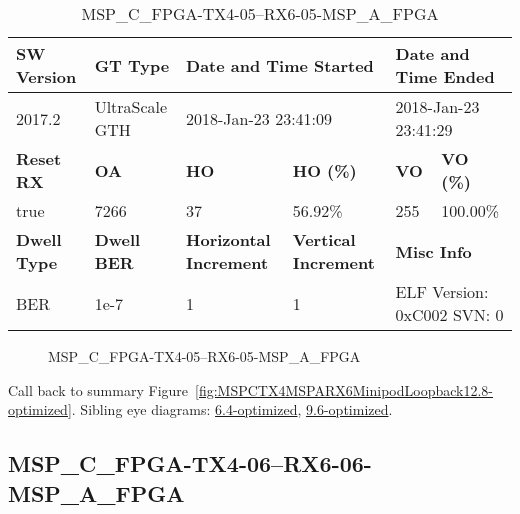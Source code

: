 \begin{table}[h]
\centering
\caption{MSP\_C\_FPGA-TX4-05--RX6-05-MSP\_A\_FPGA}
\label{tab:MSPCFPGATX405RX605MSPAFPGA12.8-optimized}
\begin{tabular}{@{}|l|l|l|l|l|l|@{}}
\toprule
\textbf{SW Version}                & \textbf{GT Type}   & \multicolumn{2}{l|}{\textbf{Date and Time Started}}            & \multicolumn{2}{l|}{\textbf{Date and Time Ended}}        \\ \midrule
2017.2                       & UltraScale GTH          & \multicolumn{2}{l|}{2018-Jan-23 23:41:09}                   & \multicolumn{2}{l|}{2018-Jan-23 23:41:29}               \\ \midrule
\textbf{Reset RX}                  & \textbf{OA} & \textbf{HO}   & \textbf{HO (\%)} & \textbf{VO} & \textbf{VO (\%)} \\ \midrule
true & 7266        & 37          & 56.92\%        & 255        & 100.00\%       \\ \midrule
\textbf{Dwell Type}                & \textbf{Dwell BER} & \textbf{Horizontal Increment} & \textbf{Vertical Increment}    & \multicolumn{2}{l|}{\textbf{Misc Info}}                  \\ \midrule
BER                            & 1e-7        & 1        & 1           & \multicolumn{2}{l|}{ELF Version: 0xC002 SVN: 0}                         \\ \bottomrule
\end{tabular}
\end{table}

\begin{figure}[h]
\caption{MSP\_C\_FPGA-TX4-05--RX6-05-MSP\_A\_FPGA} \label{fig:MSPCFPGATX405RX605MSPAFPGA12.8-optimized}
\end{figure}

Call back to summary Figure~\ref{fig:MSPCTX4MSPARX6MinipodLoopback12.8-optimized}.
Sibling eye diagrams: \hyperref[sec:MSPCFPGATX405RX605MSPAFPGA6.4-optimized]{6.4-optimized}, \hyperref[sec:MSPCFPGATX405RX605MSPAFPGA9.6-optimized]{9.6-optimized}.

\clearpage
\newpage


\subsection{MSP\_C\_FPGA-TX4-06--RX6-06-MSP\_A\_FPGA}\label{sec:MSPCFPGATX406RX606MSPAFPGA12.8-optimized}

